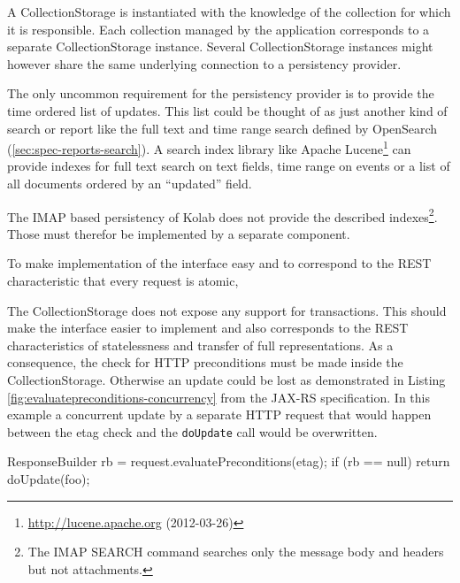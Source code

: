 \documentclass[12pt,a4paper,twoside]{scrartcl}		%
\newcommand{\citeurl}[2]{\url{#1} (#2)}
\begin{document}
A CollectionStorage is instantiated with the knowledge of the collection for
which it is responsible. Each collection managed by the application corresponds
to a separate CollectionStorage instance. Several CollectionStorage instances
might however share the same underlying connection to a persistency provider.

The only uncommon requirement for the persistency provider is to provide the
time ordered list of updates. This list could be thought of as just another kind
of search or report like the full text and time range search defined by
OpenSearch (\autoref{sec:spec-reports-search}). A search index library like
Apache Lucene\footnote{\citeurl{http://lucene.apache.org}{2012-03-26}} can
provide indexes for full text search on text fields, time range on events or a
list of all documents ordered by an ``updated'' field.

The IMAP based persistency of Kolab does not provide the described
indexes\footnote{The IMAP SEARCH command\cite[sec 6.4.4]{RFC3501} searches only
  the message body and headers but not attachments.}. Those must therefor be
implemented by a separate component.

To make implementation of the interface easy and to correspond to the REST
characteristic that every request is atomic, 

The CollectionStorage does not expose any support for transactions. This should
make the interface easier to implement and also corresponds to the REST
characteristics of statelessness and transfer of full representations. As a
consequence, the check for HTTP preconditions must be made inside the
CollectionStorage. Otherwise an update could be lost as demonstrated in Listing
\ref{fig:evaluatepreconditions-concurrency} from the JAX-RS
specification\cite[p. 28]{JAX-RS1.1}. In this example a concurrent update by a
separate HTTP request that would happen between the etag check and the
\lstinline:doUpdate: call would be overwritten.

\begin{javalisting}[label=fig:evaluatepreconditions-concurrency,
                   caption={Potential lost-update problem with JAX-RS}]
ResponseBuilder rb = request.evaluatePreconditions(etag);
if (rb == null)
  return doUpdate(foo);
\end{javalisting}


\end{document}
